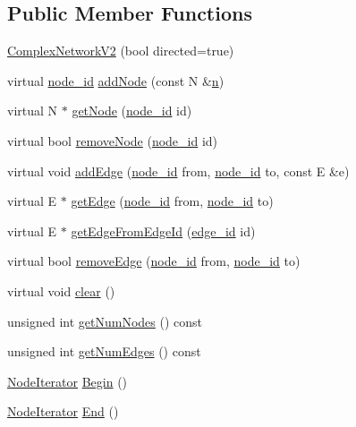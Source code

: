 \subsection*{Public Member Functions}
\begin{DoxyCompactItemize}
\item 
\hyperlink{class_complex_network_v2_ad0bc60844e1006779e826217958f9eb3}{Complex\+Network\+V2} (bool directed=true)
\item 
virtual \hyperlink{_complex_network_v2_8hpp_a8323334ca788fde39682469321590d52}{node\+\_\+id} \hyperlink{class_complex_network_v2_ac63bea705ca74ac77cee3344e3f9609e}{add\+Node} (const N \&\hyperlink{print_report_8m_aeab71244afb687f16d8c4f5ee9d6ef0e}{n})
\item 
virtual N $\ast$ \hyperlink{class_complex_network_v2_a608da16787ef57d7ae965e33ffa87469}{get\+Node} (\hyperlink{_complex_network_v2_8hpp_a8323334ca788fde39682469321590d52}{node\+\_\+id} id)
\item 
virtual bool \hyperlink{class_complex_network_v2_a8b1b3944a3e616e722322575a6a6562b}{remove\+Node} (\hyperlink{_complex_network_v2_8hpp_a8323334ca788fde39682469321590d52}{node\+\_\+id} id)
\item 
virtual void \hyperlink{class_complex_network_v2_ac846f08c3e92c642aa887801adee6aec}{add\+Edge} (\hyperlink{_complex_network_v2_8hpp_a8323334ca788fde39682469321590d52}{node\+\_\+id} from, \hyperlink{_complex_network_v2_8hpp_a8323334ca788fde39682469321590d52}{node\+\_\+id} to, const E \&e)
\item 
virtual E $\ast$ \hyperlink{class_complex_network_v2_a8eb2185022509ed813a330a9c90897b8}{get\+Edge} (\hyperlink{_complex_network_v2_8hpp_a8323334ca788fde39682469321590d52}{node\+\_\+id} from, \hyperlink{_complex_network_v2_8hpp_a8323334ca788fde39682469321590d52}{node\+\_\+id} to)
\item 
virtual E $\ast$ \hyperlink{class_complex_network_v2_a2379e544ee9681a2003504eb5630e3a3}{get\+Edge\+From\+Edge\+Id} (\hyperlink{_complex_network_v2_8hpp_ad7d18d7b90a45b6625704e92d10aa3a0}{edge\+\_\+id} id)
\item 
virtual bool \hyperlink{class_complex_network_v2_ab35860c7516d18a06d08ca926d24d49d}{remove\+Edge} (\hyperlink{_complex_network_v2_8hpp_a8323334ca788fde39682469321590d52}{node\+\_\+id} from, \hyperlink{_complex_network_v2_8hpp_a8323334ca788fde39682469321590d52}{node\+\_\+id} to)
\item 
virtual void \hyperlink{class_complex_network_v2_a85ae14174dbd7f18e652495dea73e5fe}{clear} ()
\item 
unsigned int \hyperlink{class_complex_network_v2_a62d987623c1335d7b93b3f00e266e576}{get\+Num\+Nodes} () const 
\item 
unsigned int \hyperlink{class_complex_network_v2_ae434858a60a9dde2227c596ff000e5df}{get\+Num\+Edges} () const 
\item 
\hyperlink{class_complex_network_v2_1_1_node_iterator}{Node\+Iterator} \hyperlink{class_complex_network_v2_ad7bfe6bd62d583f42f541f959ecc05f5}{Begin} ()
\item 
\hyperlink{class_complex_network_v2_1_1_node_iterator}{Node\+Iterator} \hyperlink{class_complex_network_v2_a3a82c4a7d3579015eaf4a0c064ff7738}{End} ()
\end{DoxyCompactItemize}
